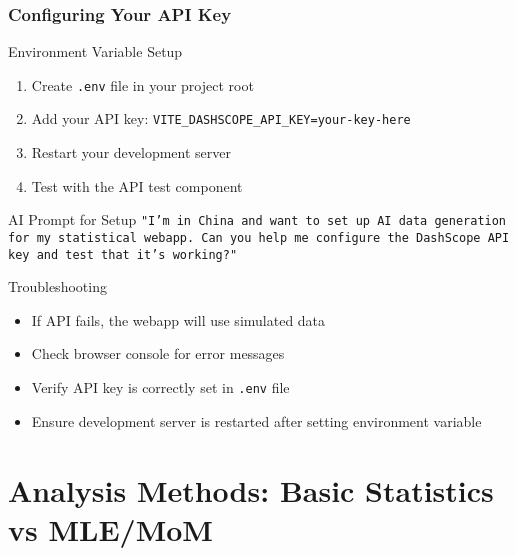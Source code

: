 \documentclass[aspectratio=169]{beamer}
\begin{document}
\begin{frame}
\frametitle{Configuring Your API Key}
\begin{alertblock}{Environment Variable Setup}
\begin{enumerate}
\footnotesize
\item Create \texttt{.env} file in your project root
\item Add your API key: \texttt{VITE\_DASHSCOPE\_API\_KEY=your-key-here}
\item Restart your development server
\item Test with the API test component
\end{enumerate}
\end{alertblock}

\begin{exampleblock}{AI Prompt for Setup}
\footnotesize
\texttt{"I'm in China and want to set up AI data generation for my statistical webapp. Can you help me configure the DashScope API key and test that it's working?"}
\end{exampleblock}

\begin{alertblock}{Troubleshooting}
\begin{itemize}
\footnotesize
\item If API fails, the webapp will use simulated data
\item Check browser console for error messages
\item Verify API key is correctly set in \texttt{.env} file
\item Ensure development server is restarted after setting environment variable
\end{itemize}
\end{alertblock}
\end{frame}

\section{Analysis Methods: Basic Statistics vs MLE/MoM}
\end{document}
